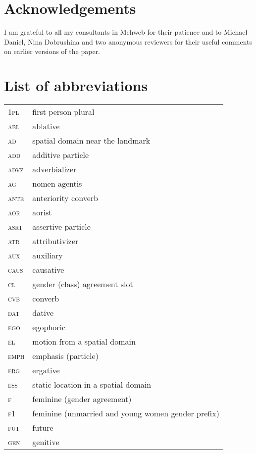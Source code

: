 ﻿\documentclass[output=paper]{langsci/langscibook}
\begin{document}
\section*{Acknowledgements}

I am grateful to all my consultants in Mehweb for their patience and
to Michael Daniel, Nina Dobrushina and two anonymous reviewers for
their useful comments on earlier versions of the paper.


\section*{List of abbreviations}

\begin{longtable}[l]{@{}ll@{}}
\textsc{1pl}	& first person plural \\
\textsc{abl}	& ablative \\
\textsc{ad}	& spatial domain near the landmark \\
\textsc{add}	& additive particle \\
\textsc{advz}	& adverbializer \\
\textsc{ag}	& nomen agentis \\
\textsc{ante}	& anteriority converb \\
\textsc{aor}	& aorist \\
\textsc{asrt}	& assertive particle \\
\textsc{atr}	& attributivizer \\
\textsc{aux}	& auxiliary \\
\textsc{caus}	& causative \\
\textsc{cl}	& gender (class) agreement slot \\
\textsc{cvb}	& converb \\
\textsc{dat}	& dative \\
\textsc{ego}	& egophoric \\
\textsc{el}	& motion from a spatial domain \\
\textsc{emph}	& emphasis (particle) \\
\textsc{erg}	& ergative \\
\textsc{ess}	& static location in a spatial domain \\
\textsc{f}	& feminine (gender agreement) \\
\textsc{f1}	& feminine (unmarried and young women gender prefix) \\
\textsc{fut}	& future \\
\textsc{gen}	& genitive \\

\end{longtable}
\end{document}
